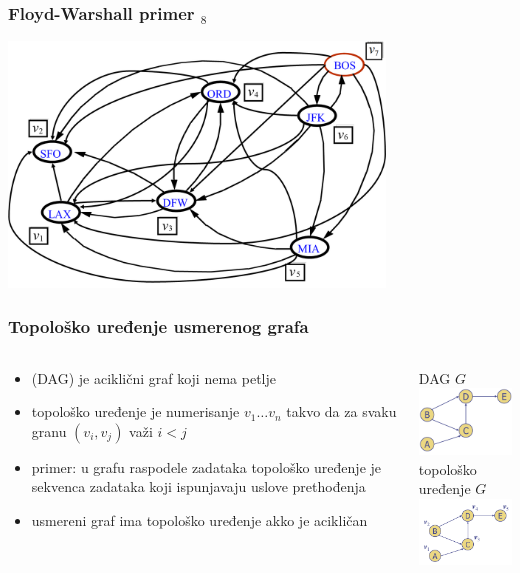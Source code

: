 \documentclass[compress,aspectratio=169]{beamer}
\begin{document}
\begin{frame}[fragile]
  \frametitle{Floyd-Warshall primer $_8$}
  \begin{center}
    \includegraphics[width=10cm]{asp-14-pic44.png}
  \end{center}
\end{frame}

\begin{frame}[fragile]
  \frametitle{Topološko uređenje usmerenog grafa}
  \begin{columns}
    \begin{column}[t]{6cm}
      \begin{itemize}
        \item {} (DAG) je aciklični graf 
          koji nema petlje
        \item topološko uređenje je numerisanje $v_{1} \ldots v_{n}$
          takvo da za svaku granu $(v_{i},v_{j})$ važi $i<j$
        \item primer: u grafu raspodele zadataka topološko uređenje je
          sekvenca zadataka koji ispunjavaju uslove prethođenja
        \item usmereni graf ima topološko uređenje akko je acikličan
      \end{itemize}
    \end{column}
    \begin{column}[t]{6cm}
      \begin{center}
        \hfill DAG $G$ \\
        \includegraphics[width=4cm]{asp-14-pic45.png} \\ 
        \hfill topološko uređenje $G$ \\
        \includegraphics[width=4.5cm]{asp-14-pic46.png}
      \end{center}
    \end{column}
  \end{columns}
\end{frame}
\end{document}
